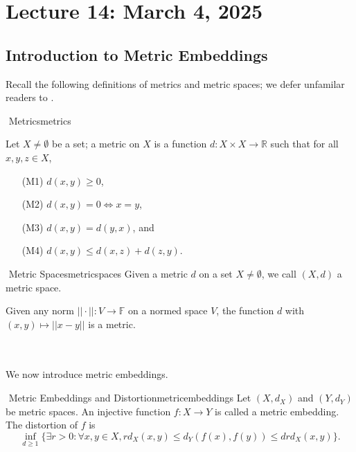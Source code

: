 \section{Lecture 14: March 4, 2025}

    \subsection{Introduction to Metric Embeddings}

        Recall the following definitions of metrics and metric spaces; we defer unfamilar readers to \cite{rudin1976principles,lang1997analysis}.
        \begin{definition}{\Stop\,\,Metrics}{metrics}
            
            Let \(X\neq\emptyset\) be a set; a metric on \(X\) is a function \(d:X\times X\to\mathbb{R}\) such that for all \(x,y,z\in X\),
            \begin{enumerate}
                \item[(M1)] \(d(x,y)\geq0\),
                \item[(M2)] \(d(x,y)=0\iff x=y\),
                \item[(M3)] \(d(x,y)=d(y,x)\), and
                \item[(M4)] \(d(x,y)\leq d(x,z)+d(z,y)\).
            \end{enumerate}

        \end{definition}
        \begin{definition}{\Stop\,\,Metric Spaces}{metricspaces}
            Given a metric \(d\) on a set \(X\neq\emptyset\), we call \((X,d)\) a metric space.
        \end{definition}
        \begin{remark*}
            Given any norm \(||\cdot||:V\to\mathbb{F}\) on a normed space \(V\), the function \(d\) with \((x,y)\mapsto ||x-y||\) is a metric.
        \end{remark*}
        \pagebreak
        \vphantom
        \\
        \\
        We now introduce metric embeddings.
        \begin{definition}{\Stop\,\,Metric Embeddings and Distortion}{metricembeddings}
            Let \((X,d_X)\) and \((Y,d_Y)\) be metric spaces. An injective function \(f:X\to Y\) is called a metric embedding. The distortion of \(f\) is 
            \begin{equation*}
                \inf_{d\geq 1}\{\exists r>0:\forall x,y\in X, rd_X(x,y)\leq d_Y(f(x),f(y))\leq drd_X(x,y)\}.
            \end{equation*}
        \end{definition}